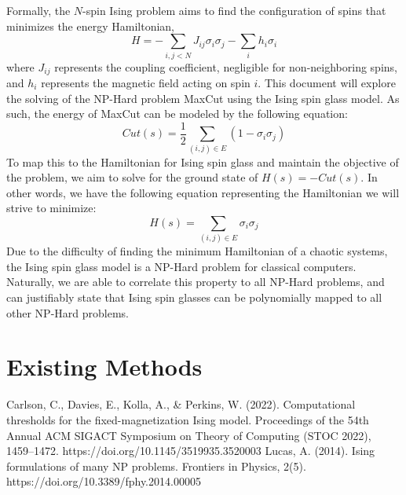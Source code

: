 \documentclass[conference]{IEEEtran}
\begin{document}
Formally, the $N$-spin Ising problem aims to find the configuration of spins that minimizes the energy Hamiltonian, 
\begin{equation}
H = -\sum_{i,j<N}J_{ij}\sigma_i\sigma_j - \sum_ih_i\sigma_i
\end{equation}
where $J_{ij}$ represents the coupling coefficient, negligible for non-neighboring spins, and $h_i$ represents the magnetic field acting on spin $i$. This document will explore the solving of the NP-Hard problem MaxCut using the Ising spin glass model. As such, the energy of MaxCut can be modeled by the following equation:
\begin{equation}
Cut(s) = \frac{1}{2}\sum_{(i,j)\in E}(1-\sigma_i\sigma_j)
\end{equation}
To map this to the Hamiltonian for Ising spin glass and maintain the objective of the problem, we aim to solve for the ground state of $H(s) = -Cut(s)$. In other words, we have the following equation representing the Hamiltonian we will strive to minimize:
\begin{equation}
H(s) = \sum_{(i,j)\in E}\sigma_i\sigma_j
\end{equation}
Due to the difficulty of finding the minimum Hamiltonian of a chaotic systems, the Ising spin glass model is a NP-Hard problem for classical computers. Naturally, we are able to correlate this property to all NP-Hard problems, and can justifiably state that Ising spin glasses can be polynomially mapped to all other NP-Hard problems\cite{b2}.

\section{Existing Methods}



\begin{thebibliography}{00}
 Carlson, C., Davies, E., Kolla, A., \& Perkins, W. (2022). Computational thresholds for the fixed-magnetization Ising model. Proceedings of the 54th Annual ACM SIGACT Symposium on Theory of Computing (STOC 2022), 1459–1472. https://doi.org/10.1145/3519935.3520003
 Lucas, A. (2014). Ising formulations of many NP problems. Frontiers in Physics, 2(5). https://doi.org/10.3389/fphy.2014.00005



\end{thebibliography}
\end{document}
